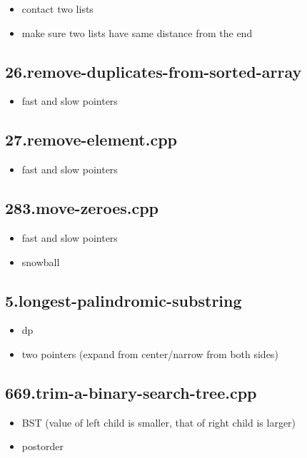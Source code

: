 \begin{itemize}
	\item contact two lists
	\item make sure two lists have same distance from the end
\end{itemize}

\subsection{26.remove-duplicates-from-sorted-array}

\begin{itemize}
	\item fast and slow pointers
\end{itemize}

\subsection{27.remove-element.cpp}

\begin{itemize}
	\item fast and slow pointers
\end{itemize}

\subsection{283.move-zeroes.cpp}

\begin{itemize}
	\item fast and slow pointers
	\item snowball
\end{itemize}

\subsection{5.longest-palindromic-substring}

\begin{itemize}
	\item dp
	\item two pointers (expand from center/narrow from both sides)
\end{itemize}

\subsection{669.trim-a-binary-search-tree.cpp}

\begin{itemize}
	\item BST (value of left child is smaller, that of right child is larger)
	\item postorder
\end{itemize}

